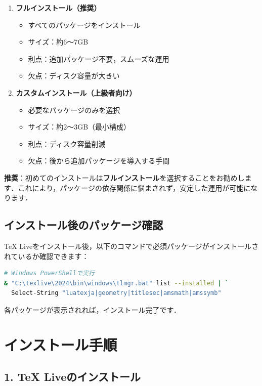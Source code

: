 \documentclass[11pt]{ltjarticle}
\begin{document}
\begin{enumerate}
  \item \textbf{フルインストール（推奨）}
    \begin{itemize}
      \item すべてのパッケージをインストール
      \item サイズ：約6〜7GB
      \item 利点：追加パッケージ不要，スムーズな運用
      \item 欠点：ディスク容量が大きい
    \end{itemize}

  \item \textbf{カスタムインストール（上級者向け）}
    \begin{itemize}
      \item 必要なパッケージのみを選択
      \item サイズ：約2〜3GB（最小構成）
      \item 利点：ディスク容量削減
      \item 欠点：後から追加パッケージを導入する手間
    \end{itemize}
\end{enumerate}

\textbf{推奨}：初めてのインストールは\textbf{フルインストール}を選択することをお勧めします．これにより，パッケージの依存関係に悩まされず，安定した運用が可能になります．

\subsection{インストール後のパッケージ確認}

TeX Liveをインストール後，以下のコマンドで必須パッケージがインストールされているか確認できます：

\begin{lstlisting}[language=bash]
# Windows PowerShellで実行
& "C:\texlive\2024\bin\windows\tlmgr.bat" list --installed | `
  Select-String "luatexja|geometry|titlesec|amsmath|amssymb"
\end{lstlisting}

各パッケージが表示されれば，インストール完了です．

\section{インストール手順}

\subsection{1. TeX Liveのインストール}
\end{document}

